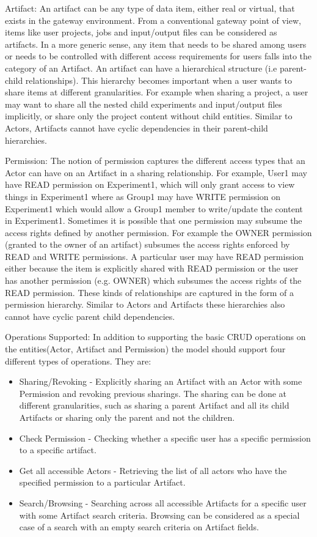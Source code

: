 \documentclass[sigconf]{acmart}
\begin{document}
Artifact: An artifact can be any type of data item, either real or virtual, that exists in the gateway environment. From a conventional gateway point of view, items like user projects, jobs and input/output files can be considered as artifacts. In a more generic sense, any item that needs to be shared among users or needs to be controlled with different access requirements for users falls into the category of an Artifact. An artifact can have a hierarchical structure (i.e parent-child relationships). This hierarchy becomes important when a user wants to share items at different granularities. For example when sharing a project, a user may want to share all the nested child experiments and input/output files implicitly, or share only the project content without child entities. Similar to Actors, Artifacts cannot have cyclic dependencies in their parent-child hierarchies.

Permission: The notion of permission captures the different access types that an Actor can have on an Artifact in a sharing relationship. For example, User1 may have READ permission on Experiment1, which will only grant access to view things in Experiment1 where as Group1 may have WRITE permission on Experiment1 which would allow a Group1 member to write/update the content in Experiment1. Sometimes it is possible that one permission may subsume the access rights defined by another permission. For example the OWNER permission (granted to the owner of an artifact) subsumes the access rights enforced by READ and WRITE permissions. A particular user may have READ permission either because the item is explicitly shared with READ permission or the user has another permission (e.g. OWNER) which subsumes the access rights of the READ permission. These kinds of relationships are captured in the form of a permission hierarchy. Similar to Actors and Artifacts these hierarchies also cannot have cyclic parent child dependencies.

Operations Supported: In addition to supporting the basic CRUD operations on the entities(Actor, Artifact and Permission) the model should support four different types of operations. They are:
\begin{itemize}
\item
Sharing/Revoking - Explicitly sharing an Artifact with an Actor with some Permission and revoking previous sharings. The sharing can be done at different granularities, such as sharing a parent Artifact and all its child Artifacts or sharing only the parent and not the children.
\item
Check Permission - Checking whether a specific user has a specific permission to a specific artifact.
\item
Get all accessible Actors - Retrieving the list of all actors who have the specified permission to a particular Artifact. 
\item
Search/Browsing - Searching across all accessible Artifacts for a specific user with some Artifact search criteria. Browsing can be considered as a special case of a search with an empty search criteria on Artifact fields.
\end{itemize}
\end{document}
